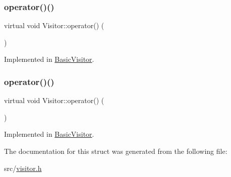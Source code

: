 \subsubsection{\texorpdfstring{operator()()}{operator()()}\hspace{0.1cm}{\footnotesize\ttfamily [59/60]}}
{\footnotesize\ttfamily virtual void Visitor\+::operator() (\begin{DoxyParamCaption}\item[{const \hyperlink{struct_formal_parameter_list}{Formal\+Parameter\+List} \&}]{ }\end{DoxyParamCaption})\hspace{0.3cm}{\ttfamily [pure virtual]}}



Implemented in \hyperlink{struct_basic_visitor_a3ce54960164c84e8d61c4c710362d6e3}{Basic\+Visitor}.

\mbox{\label{struct_visitor_ab6afd14c23c1fa6f01d24e2593ac91bf}} 
\subsubsection{\texorpdfstring{operator()()}{operator()()}\hspace{0.1cm}{\footnotesize\ttfamily [60/60]}}
{\footnotesize\ttfamily virtual void Visitor\+::operator() (\begin{DoxyParamCaption}\item[{const \hyperlink{struct_program_declaration}{Program\+Declaration} \&}]{ }\end{DoxyParamCaption})\hspace{0.3cm}{\ttfamily [pure virtual]}}



Implemented in \hyperlink{struct_basic_visitor_a365071938626ac065ac413ba0e6d382f}{Basic\+Visitor}.



The documentation for this struct was generated from the following file\+:\begin{DoxyCompactItemize}
\item 
src/\hyperlink{visitor_8h}{visitor.\+h}\end{DoxyCompactItemize}
